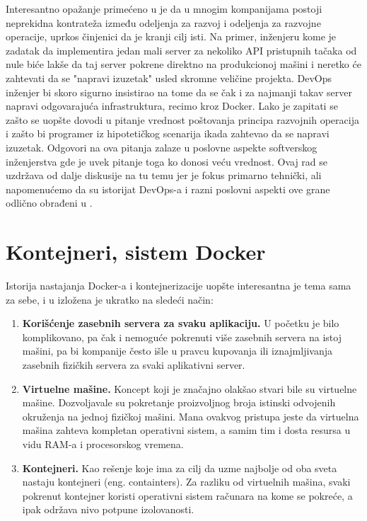 \documentclass[12pt,oneside]{memoir}
\begin{document}
Interesantno opažanje primećeno u \cite{devopshandbook} je da u mnogim kompanijama postoji neprekidna kontrateža između odeljenja za razvoj i odeljenja za razvojne operacije, uprkos činjenici da je kranji cilj isti. Na primer, inženjeru kome je zadatak da implementira jedan mali server za nekoliko API pristupnih tačaka od nule biće lakše da taj server pokrene direktno na produkcionoj mašini i neretko će zahtevati da se "napravi izuzetak" usled skromne veličine projekta. DevOps inženjer bi skoro sigurno insistirao na tome da se čak i za najmanji takav server napravi odgovarajuća infrastruktura, recimo kroz Docker. Lako je zapitati se zašto se uopšte dovodi u pitanje vrednost poštovanja principa razvojnih operacija i zašto bi programer iz hipotetičkog scenarija ikada zahtevao da se napravi izuzetak. Odgovori na ova pitanja zalaze u poslovne aspekte softverskog inženjerstva gde je uvek pitanje toga ko donosi veću vrednost. Ovaj rad se uzdržava od dalje diskusije na tu temu jer je fokus primarno tehnički, ali napomenućemo da su istorijat DevOps-a i razni poslovni aspekti ove grane odlično obrađeni u \cite{devopshandbook}.


\section{Kontejneri, sistem Docker}

Istorija nastajanja Docker-a i kontejnerizacije uopšte interesantna je tema sama za sebe, i u \cite{dockerdeepdive} izložena je ukratko na sledeći način:
\begin{enumerate}
    \item \textbf{Korišćenje zasebnih servera za svaku aplikaciju.} U početku je bilo komplikovano, pa čak i nemoguće pokrenuti više zasebnih servera na istoj mašini, pa bi kompanije često išle u pravcu kupovanja ili iznajmljivanja zasebnih fizičkih servera za svaki aplikativni server.
    \item \textbf{Virtuelne mašine.} Koncept koji je značajno olakšao stvari bile su virtuelne mašine. Dozvoljavale su pokretanje proizvoljnog broja istinski odvojenih okruženja na jednoj fizičkoj mašini. Mana ovakvog pristupa jeste da virtuelna mašina zahteva kompletan operativni sistem, a samim tim i dosta resursa u vidu RAM-a i procesorskog vremena.
    \item \textbf{Kontejneri.} Kao rešenje koje ima za cilj da uzme najbolje od oba sveta nastaju kontejneri (eng. containters). Za razliku od virtuelnih mašina, svaki pokrenut kontejner koristi operativni sistem računara na kome se pokreće, a ipak održava nivo potpune izolovanosti.
\end{enumerate}
\end{document}
